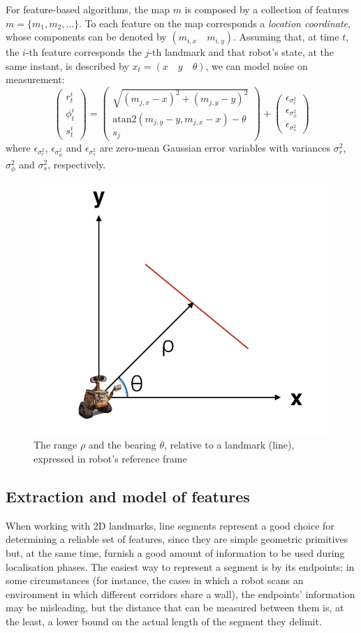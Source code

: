 \documentclass[a4paper, onecolumn]{report}
\begin{document}
For feature-based algorithms, the map $m$ is composed by a collection of features $m = \{m_1, m_2, \dots \}$. To each feature on the map corresponds a \emph{location coordinate}, whose components can be denoted by $(m_{i,x} \quad m_{i,y})$. Assuming that, at time $t$, the $i$-th feature corresponds the $j$-th landmark and that robot's state, at the same instant, is described by $x_t = (x \quad y \quad \theta)$, we can model noise on measurement:
\begin{equation}
	\left(\begin{matrix} r_t^i \\ \phi_t^i \\ s_t^i	\end{matrix} \right) = \left( \begin{matrix} \sqrt{(m_{j,x} - x)^2 + (m_{j,y} - y)^2} \\ \mbox{atan2}(m_{j,y} - y, m_{j,x}-x) - \theta \\ s_j\end{matrix}\right) + \left( \begin{matrix}\epsilon_{\sigma_r^2} \\ \epsilon_{\sigma_{\phi}^2} \\ \epsilon_{\sigma_s^2}\end{matrix}\right)
\end{equation}
where $\epsilon_{\sigma_r^2}$, $\epsilon_{\sigma_\phi^2}$ and $\epsilon_{\sigma_s^2}$ are zero-mean Gaussian error variables with variances $\sigma_r^2$, $\sigma_\phi^2$ and $\sigma_s^2$, respectively.

\begin{figure}[htbp]
\centering
\includegraphics[width=.50\textwidth]{images/rho_theta.jpeg}
\caption{The range $\rho$ and the bearing $\theta$, relative to a landmark (line), expressed in robot's reference frame}
\end{figure}

\subsection{Extraction and model of features}
When working with 2D landmarks, line segments represent a good choice for determining a reliable set of features, since they are simple geometric primitives but, at the same time, furnish a good amount of information to be used during localisation phases. The easiest way to represent a segment is by its endpoints; in some circumstances (for instance, the cases in which a robot scans an environment in which different corridors share a wall), the endpoints' information may be misleading, but the distance that can be measured between them is, at the least, a lower bound on the actual length of the segment they delimit.
\end{document}
